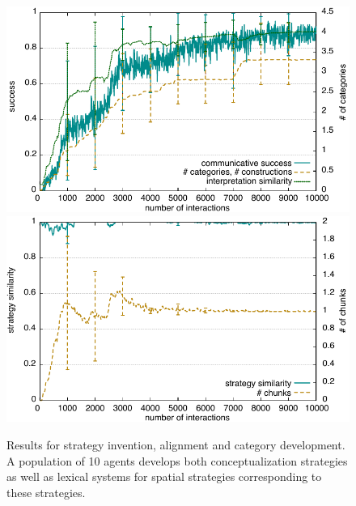 \begin{figure}
\begin{center}
\includegraphics[width=0.9\columnwidth]{figs/chunk-alignment-category-invention-success}
\includegraphics[width=0.9\columnwidth]{figs/chunk-alignment-category-invention-alignment}
\end{center}
\caption[Results for strategy invention, alignment and category development]{
Results for strategy invention, alignment and category development. A population
of 10 agents develops both conceptualization strategies as well as lexical systems for 
spatial strategies corresponding to these strategies.}
\label{f:strategy-invention-dynamics}
\end{figure}




